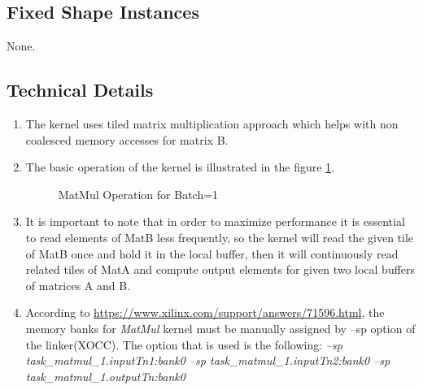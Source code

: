 \subsection{Fixed Shape Instances}
None.

\subsection{Technical Details}
\begin{enumerate}
\item The kernel uses tiled matrix multiplication approach which helps with non coalesced memory accesses for matrix B.
\item The basic operation of the kernel is illustrated in the figure \ref{fig:matmul01}.

\begin{figure}[h] 
\caption{MatMul Operation for Batch=1}
\label{fig:matmul01}
\centering
{}
\end{figure}


\item It is important to note that in order to maximize performance it is essential to read elements of MatB less frequently, so the kernel will read the given tile of MatB once and hold it in the local buffer, then it will continuously read related tiles of MatA and compute output elements for given two local buffers of matrices A and B. 

\item According to \url{https://www.xilinx.com/support/answers/71596.html}, the memory banks for \emph{MatMul} kernel must be manually assigned by --sp option of the linker(XOCC). The option that is used is the following: \emph{--sp task\_matmul\_1.inputTn1:bank0 --sp task\_matmul\_1.inputTn2:bank0 --sp task\_matmul\_1.outputTn:bank0}
\end{enumerate}







